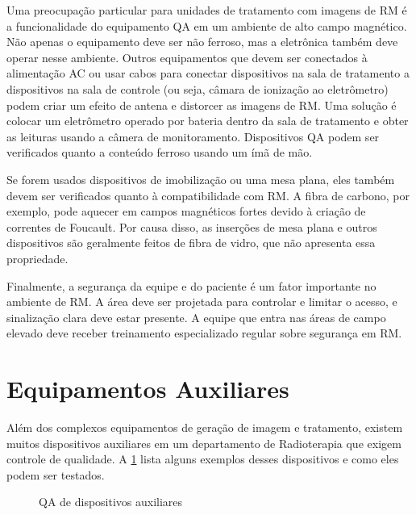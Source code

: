 \documentclass[11pt,a4paper]{article}
\newcounter{exemplo}
\begin{document}
	Uma preocupação particular para unidades de tratamento com imagens de RM é a funcionalidade do equipamento QA em um ambiente de alto campo magnético. Não apenas o equipamento deve ser não ferroso, mas a eletrônica também deve operar nesse ambiente. Outros equipamentos que devem ser conectados à alimentação AC ou usar cabos para conectar dispositivos na sala de tratamento a dispositivos na sala de controle (ou seja, câmara de ionização ao eletrômetro) podem criar um efeito de antena e distorcer as imagens de RM. Uma solução é colocar um eletrômetro operado por bateria dentro da sala de tratamento e obter as leituras usando a câmera de monitoramento. Dispositivos QA podem ser verificados quanto a conteúdo ferroso usando um ímã de mão.

	Se forem usados dispositivos de imobilização ou uma mesa plana, eles também devem ser verificados quanto à compatibilidade com RM. A fibra de carbono, por exemplo, pode aquecer em campos magnéticos fortes devido à criação de correntes de Foucault. Por causa disso, as inserções de mesa plana e outros dispositivos são geralmente feitos de fibra de vidro, que não apresenta essa propriedade.

	Finalmente, a segurança da equipe e do paciente é um fator importante no ambiente de RM. A área deve ser projetada para controlar e limitar o acesso, e sinalização clara deve estar presente. A equipe que entra nas áreas de campo elevado deve receber treinamento especializado regular sobre segurança em RM.

\section{Equipamentos Auxiliares}

	Além dos complexos equipamentos de geração de imagem e tratamento, existem muitos dispositivos auxiliares em um departamento de Radioterapia que exigem controle de qualidade. A \ref{fig:dispAux} lista alguns exemplos desses dispositivos e como eles podem ser testados.

	\begin{figure}[!h]
		\centering
		\caption{QA de dispositivos auxiliares}
		\label{fig:dispAux}
	\end{figure}
\end{document}

